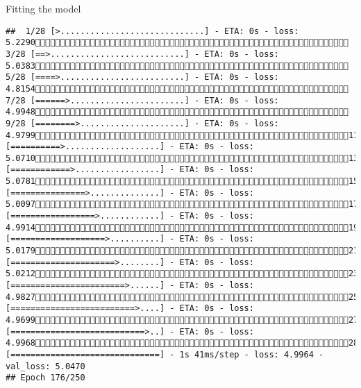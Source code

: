 \documentclass[
  ignorenonframetext,
]{beamer}
\begin{document}
\begin{frame}[fragile]{Fitting the model}
\begin{verbatim}
##  1/28 [>.............................] - ETA: 0s - loss: 5.2290 3/28 [==>...........................] - ETA: 0s - loss: 5.0383 5/28 [====>.........................] - ETA: 0s - loss: 4.8154 7/28 [======>.......................] - ETA: 0s - loss: 4.9948 9/28 [========>.....................] - ETA: 0s - loss: 4.979911/28 [==========>...................] - ETA: 0s - loss: 5.071013/28 [============>.................] - ETA: 0s - loss: 5.078115/28 [===============>..............] - ETA: 0s - loss: 5.009717/28 [=================>............] - ETA: 0s - loss: 4.991419/28 [===================>..........] - ETA: 0s - loss: 5.017921/28 [=====================>........] - ETA: 0s - loss: 5.021223/28 [=======================>......] - ETA: 0s - loss: 4.982725/28 [=========================>....] - ETA: 0s - loss: 4.969927/28 [===========================>..] - ETA: 0s - loss: 4.996828/28 [==============================] - 1s 41ms/step - loss: 4.9964 - val_loss: 5.0470
## Epoch 176/250

\end{verbatim}
\end{frame}
\end{document}
